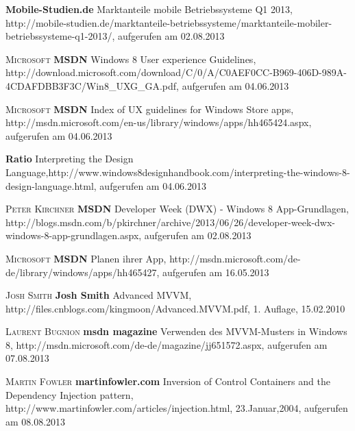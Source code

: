 \begin{thebibliography}{---}
              \textbf{Mobile-Studien.de}
              Marktanteile mobile Betriebssysteme Q1 2013, http://mobile-studien.de/marktanteile-betriebssysteme/marktanteile-mobiler-betriebssysteme-q1-2013/, aufgerufen am 02.08.2013
 
            \textsc{Microsoft}
           \textbf{MSDN}
           Windows 8 User experience Guidelines, http://download.microsoft.com/download/C/0/A/C0AEF0CC-B969-406D-989A-4CDAFDBB3F3C/Win8\_UXG\_GA.pdf, aufgerufen am 04.06.2013
                        
           \textsc{Microsoft}
          \textbf{MSDN}
          Index of UX guidelines for Windows Store apps, http://msdn.microsoft.com/en-us/library/windows/apps/hh465424.aspx, aufgerufen am 04.06.2013
          
           \textbf{Ratio}
          Interpreting the Design Language,http://www.windows8designhandbook.com/interpreting-the-windows-8-design-language.html, aufgerufen am 04.06.2013
           
            \textsc{Peter Kirchner}
           \textbf{MSDN}
           Developer Week (DWX) - Windows 8 App-Grundlagen, http://blogs.msdn.com/b/pkirchner/archive/2013/06/26/developer-week-dwx-windows-8-app-grundlagen.aspx, aufgerufen am 02.08.2013
  
                \textsc{Microsoft}
               \textbf{MSDN}
 			Planen ihrer App, http://msdn.microsoft.com/de-de/library/windows/apps/hh465427, aufgerufen am 16.05.2013

  		\textsc{Josh Smith}
  		\textbf{Josh Smith}
  Advanced MVVM, http://files.cnblogs.com/kingmoon/Advanced.MVVM.pdf, 1. Auflage, 15.02.2010 
    
                  \textsc{Laurent Bugnion}
                 \textbf{msdn magazine}
   			Verwenden des MVVM-Musters in Windows 8, http://msdn.microsoft.com/de-de/magazine/jj651572.aspx, aufgerufen am 07.08.2013
   			
                     \textsc{Martin Fowler}
                    \textbf{martinfowler.com}
      			Inversion of Control Containers and the Dependency Injection pattern, http://www.martinfowler.com/articles/injection.html, 23.Januar,2004, aufgerufen am 08.08.2013
 
 
\end{thebibliography}

